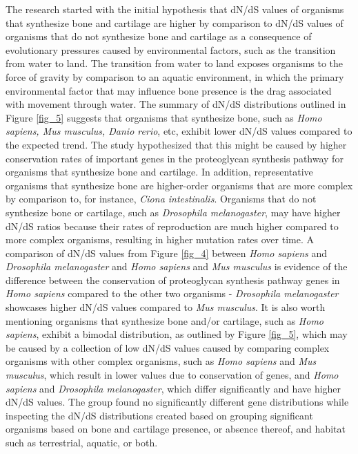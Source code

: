 \documentclass{article}
\begin{document}
The research started with the initial hypothesis that dN/dS values of organisms that synthesize bone and cartilage are higher by comparison to dN/dS values of organisms that do not synthesize bone and cartilage as a consequence of evolutionary pressures caused by environmental factors, such as the transition from water to land. The transition from water to land exposes organisms to the force of gravity by comparison to an aquatic environment, in which the primary environmental factor that may influence bone presence is the drag associated with movement through water. The summary of dN/dS distributions outlined in Figure \ref{fig_5} suggests that organisms that synthesize bone, such as \textit{Homo sapiens, Mus musculus, Danio rerio}, etc, exhibit lower dN/dS values compared to the expected trend. The study hypothesized that this might be caused by higher conservation rates of important genes in the proteoglycan synthesis pathway for organisms that synthesize bone and cartilage. In addition, representative organisms that synthesize bone are higher-order organisms that are more complex by comparison to, for instance, \textit{Ciona intestinalis}. Organisms that do not synthesize bone or cartilage, such as \textit{Drosophila melanogaster}, may have higher dN/dS ratios because their rates of reproduction are much higher compared to more complex organisms, resulting in higher mutation rates over time. A comparison of dN/dS values from Figure \ref{fig_4} between \textit{Homo sapiens} and \textit{Drosophila melanogaster} and \textit{Homo sapiens} and \textit{Mus musculus} is evidence of the difference between the conservation of proteoglycan synthesis pathway genes in \textit{Homo sapiens} compared to the other two organisms - \textit{Drosophila melanogaster} showcases higher dN/dS values compared to \textit{Mus musculus}. It is also worth mentioning organisms that synthesize bone and/or cartilage, such as \textit{Homo sapiens}, exhibit a bimodal distribution, as outlined by Figure \ref{fig_5}, which may be caused by a collection of low dN/dS values caused by comparing complex organisms with other complex organisms, such as \textit{Homo sapiens} and \textit{Mus musculus}, which result in lower values due to conservation of genes, and \textit{Homo sapiens} and \textit{Drosophila melanogaster}, which differ significantly and have higher dN/dS values. The group found no significantly different gene distributions while inspecting the dN/dS distributions created based on grouping significant organisms based on bone and cartilage presence, or absence thereof, and habitat such as terrestrial, aquatic, or both.
\end{document}
